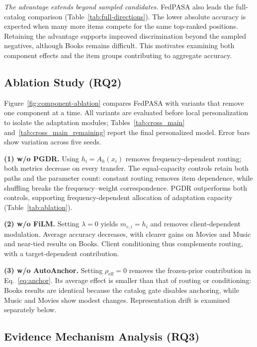 \noindent\textit{The advantage extends beyond sampled candidates.}
FedPASA also leads the full-catalog comparison (Table~\ref{tab:full-directions}). The lower absolute accuracy is expected when many more items compete for the same top-ranked positions. Retaining the advantage supports improved discrimination beyond the sampled negatives, although Books remains difficult. This motivates examining both component effects and the item groups contributing to aggregate accuracy.

\subsection{Ablation Study (RQ2)}
\label{sec:exp-ablation}





Figure~\ref{fig:component-ablation} compares FedPASA with variants that remove one component at a time. All variants are evaluated before local personalization to isolate the adaptation modules; Tables~\ref{tab:cross_main} and~\ref{tab:cross_main_remaining} report the final personalized model. Error bars show variation across five seeds.

\noindent\textbf{(1) w/o PGDR.}
Using $h_i=A_h(x_i)$ removes frequency-dependent routing; both metrics decrease on every transfer. The equal-capacity controls retain both paths and the parameter count: constant routing removes item dependence, while shuffling breaks the frequency--weight correspondence. PGDR outperforms both controls, supporting frequency-dependent allocation of adaptation capacity (Table~\ref{tab:ablation}).

\noindent\textbf{(2) w/o FiLM.}
Setting $\lambda=0$ yields $m_{c,i}=h_i$ and removes client-dependent modulation. Average accuracy decreases, with clearer gains on Movies and Music and near-tied results on Books. Client conditioning thus complements routing, with a target-dependent contribution.

\noindent\textbf{(3) w/o AutoAnchor.}
Setting $\rho_{\mathrm{eff}}=0$ removes the frozen-prior contribution in Eq.~\eqref{eq:anchor}. Its average effect is smaller than that of routing or conditioning: Books results are identical because the catalog gate disables anchoring, while Music and Movies show modest changes. Representation drift is examined separately below.

\subsection{Evidence Mechanism Analysis (RQ3)}
\label{sec:exp-buckets}







